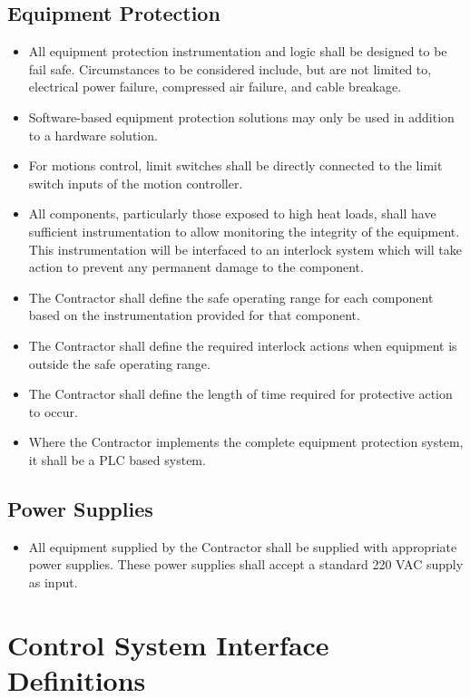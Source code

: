 \documentclass[11pt
  , a4paper
  , article
  , oneside
]{memoir}
\begin{document}
\section{Equipment Protection}
\begin{itemize}
  \item All equipment protection instrumentation and logic shall be designed to be fail safe. Circumstances to be considered include, but are not limited to, electrical power failure, compressed air failure, and cable breakage. 
  \item Software-based equipment protection solutions may only be used in addition to a hardware solution.
  \item For motions control, limit switches shall be directly connected to the limit switch inputs of the motion controller.
  \item All components, particularly those exposed to high heat loads, shall have sufficient instrumentation to allow monitoring the integrity of the equipment. This instrumentation will be interfaced to an interlock system which will take action to prevent any permanent damage to the component.
  \item The Contractor shall define the safe operating range for each component based on the instrumentation provided for that component.
  \item The Contractor shall define the required interlock actions when equipment is outside the safe operating range.
  \item The Contractor shall define the length of time required for protective action to occur.
  \item Where the Contractor implements the complete equipment protection system, it shall be a PLC based system. 
\end{itemize}


\section{Power Supplies}
\begin{itemize}
\item All equipment supplied by the Contractor shall be supplied with appropriate power supplies. These power supplies shall accept a standard 220 VAC supply as input.
\end{itemize}


\chapter{Control System Interface Definitions}
\end{document}

